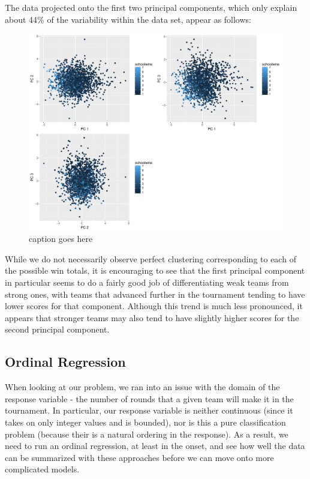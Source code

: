 \documentclass[10pt,a4paper, hidelinks]{article} %
\begin{document}

The data projected onto the first two principal components, which only explain about 44\% of the variability within the data set, appear as follows:

\begin{figure}[H]
	\centering
	\includegraphics[width=0.7\linewidth]{../fig/PrinComps}
	\caption{caption goes here}
	\label{fig:princomps}
\end{figure}


While we do not necessarily observe perfect clustering corresponding to each of the possible win totals, it is encouraging to see that the first principal component in particular seems to do a fairly good job of differentiating weak teams from strong ones, with teams that advanced further in the tournament tending to have lower scores for that component. Although this trend is much less pronounced, it appears that stronger teams may also tend to have slightly higher scores for the second principal component. 


\subsection{Ordinal Regression}

When looking at our problem, we ran into an issue with the domain of the response variable - the number of rounds that a given team will make it in the tournament. In particular, our response variable is neither continuous (since it takes on only integer values and is bounded), nor is this a pure classification problem (because their is a natural ordering in the response). As a result, we need to run an ordinal regression, at least in the onset, and see how well the data can be summarized with these approaches before we can move onto more complicated models. 
\end{document}
